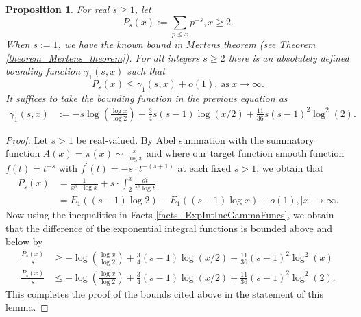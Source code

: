 \documentclass[11pt,reqno,a4letter]{article}
\numberwithin{figure}{section}
\numberwithin{table}{section}
\theoremstyle{plain}
\newtheorem{prop}[theorem]{Proposition}
\numberwithin{theorem}{section}
\theoremstyle{definition}
\newcommand{\NBRef}[1]{}
\begin{document}
\begin{prop} 
\label{cor_PartialSumsOfReciprocalsOfPrimePowers} 
For real $s \geq 1$, let 
\[
P_s(x) := \sum_{p \leq x} p^{-s}, x \geq 2. 
\]
When $s := 1$, we have the known bound in Mertens theorem 
(see Theorem \ref{theorem_Mertens_theorem}). 
For all integers $s \geq 2$ 
there is an absolutely defined bounding function $\gamma_1(s, x)$ such that 
\[
P_s(x) \leq \gamma_1(s, x) + o(1), \mathrm{\ as\ } x \rightarrow \infty. 
\] 
It suffices to take the bounding function in the previous equation as 
\begin{align*}
\gamma_1(s, x) & := -s\log\left(\frac{\log x}{\log 2}\right) + \frac{3}{4}s(s-1) \log(x/2) + 
     \frac{11}{36} s(s-1)^2 \log^2(2). 
\end{align*}
\end{prop} 
\NBRef{A05-2020-04-26} 
\begin{proof} 
Let $s > 1$ be real-valued. 
By Abel summation with the summatory function $A(x) = \pi(x) \sim \frac{x}{\log x}$ and where 
our target function smooth function $f(t) = t^{-s}$ with 
$f^{\prime}(t) = -s \cdot t^{-(s+1)}$ at each fixed $s > 1$, we obtain that 
\begin{align*} 
P_s(x) & = \frac{1}{x^s \cdot \log x} + s \cdot \int_2^{x} \frac{dt}{t^s \log t} \\ 
     & = E_1((s-1) \log 2) - E_1((s-1) \log x) + o(1), |x| \rightarrow \infty. 
\end{align*} 
Now using the inequalities in Facts \ref{facts_ExpIntIncGammaFuncs}, we obtain that the 
difference of the exponential integral functions is bounded above and below by 
\begin{align*} 
\frac{P_s(x)}{s} & \geq -\log\left(\frac{\log x}{\log 2}\right) + \frac{3}{4}(s-1) \log(x/2) - 
     \frac{11}{36} (s-1)^2 \log^2(x) \\ 
\frac{P_s(x)}{s} & \leq -\log\left(\frac{\log x}{\log 2}\right) + \frac{3}{4}(s-1) \log(x/2) + 
     \frac{11}{36} (s-1)^2 \log^2(2). 
\end{align*} 
This completes the proof of the bounds cited above in the statement of this lemma. 
\end{proof} 
\end{document}
